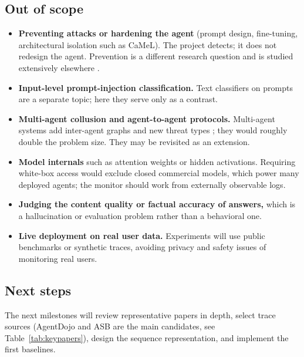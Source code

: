 \documentclass[11pt,a4paper]{article}
\begin{document}
\subsection{Out of scope}
\begin{itemize}
  \item \textbf{Preventing attacks or hardening the agent} (prompt design, fine-tuning, architectural isolation such as CaMeL). The project detects; it does not redesign the agent. Prevention is a different research question and is studied extensively elsewhere \citep{debenedetti2025camel}.
  \item \textbf{Input-level prompt-injection classification.} Text classifiers on prompts are a separate topic; here they serve only as a contrast.
  \item \textbf{Multi-agent collusion and agent-to-agent protocols.} Multi-agent systems add inter-agent graphs and new threat types \citep{he2025sentinelagent}; they would roughly double the problem size. They may be revisited as an extension.
  \item \textbf{Model internals} such as attention weights or hidden activations. Requiring white-box access would exclude closed commercial models, which power many deployed agents; the monitor should work from externally observable logs.
  \item \textbf{Judging the content quality or factual accuracy of answers,} which is a hallucination or evaluation problem rather than a behavioral one.
  \item \textbf{Live deployment on real user data.} Experiments will use public benchmarks or synthetic traces, avoiding privacy and safety issues of monitoring real users.
\end{itemize}

\subsection{Next steps}
The next milestones will review representative papers in depth, select trace sources (AgentDojo and ASB are the main candidates, see Table~\ref{tab:keypapers}), design the sequence representation, and implement the first baselines.



\end{document}
